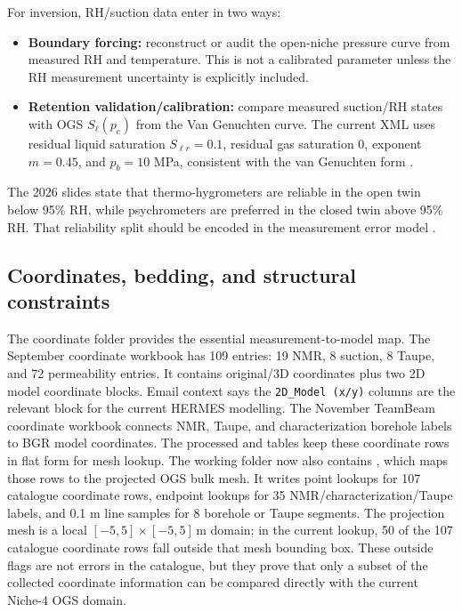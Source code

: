 For inversion, RH/suction data enter in two ways:

\begin{itemize}[leftmargin=1.5em]
  \item \textbf{Boundary forcing:} reconstruct or audit the open-niche pressure curve
  from measured RH and temperature.  This is not a calibrated parameter unless the RH
  measurement uncertainty is explicitly included.
  \item \textbf{Retention validation/calibration:} compare measured suction/RH states
  with OGS \(S_\ell(p_c)\) from the Van Genuchten curve.  The current XML uses
  residual liquid saturation \(S_{\ell r}=0.1\), residual gas saturation \(0\),
  exponent \(m=0.45\), and \(p_b=10\) MPa, consistent with the van Genuchten form
  \cite[pp.~892--895]{VanGenuchten1980}.
\end{itemize}

The 2026 slides state that thermo-hygrometers are reliable in the open twin below
95\% RH, while psychrometers are preferred in the closed twin above 95\% RH.  That
reliability split should be encoded in the measurement error model
\cite[PDF p.~6]{TDMinutes2026Local}.

\subsection{Coordinates, bedding, and structural constraints}

The coordinate folder provides the essential measurement-to-model map.  The September
coordinate workbook has 109 entries: 19 NMR, 8 suction, 8 Taupe, and 72 permeability
entries.  It contains original/3D coordinates plus two 2D model coordinate blocks.
Email context says the \texttt{2D\_Model (x/y)} columns are the relevant block for the
current HERMES modelling.  The November TeamBeam coordinate workbook connects NMR,
Taupe, and characterization borehole labels to BGR model coordinates.  The processed
 and  tables keep
these coordinate rows in flat form for mesh lookup.  The working folder now also
contains , which
maps those rows to the projected OGS bulk mesh.  It writes point lookups for 107
catalogue coordinate rows, endpoint lookups for 35 NMR/characterization/Taupe labels,
and 0.1 m line samples for 8 borehole or Taupe segments.  The projection mesh is a
local \([-5,5]\times[-5,5]\,\mathrm{m}\) domain; in the current lookup, 50 of the 107
catalogue coordinate rows fall outside that mesh bounding box.  These outside flags
are not errors in the catalogue, but they prove that only a subset of the collected
coordinate information can be compared directly with the current Niche-4 OGS domain.

